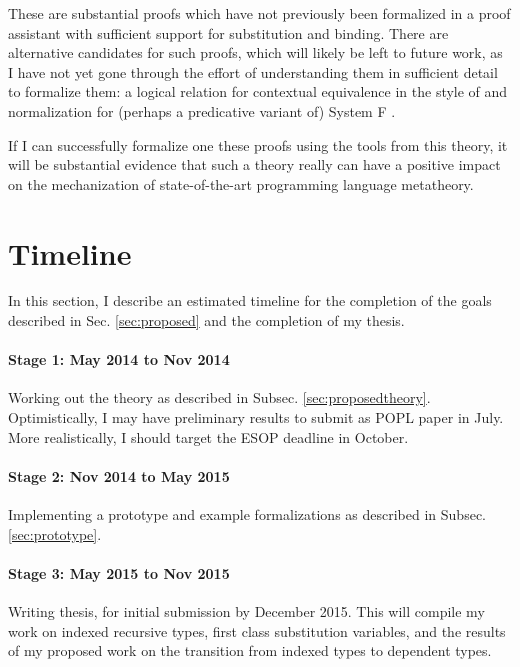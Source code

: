 \documentclass{article}
\begin{document}
These are substantial proofs which have not previously been
formalized in a proof assistant with sufficient support for
substitution and binding. There are alternative candidates for such
proofs, which will likely be left to future work, as I have not yet
gone through the effort of understanding them in sufficient detail to
formalize them: a logical relation
for contextual equivalence in the style of
\cite{Dreyer11} and normalization for (perhaps a predicative variant
of) System F \citep{ProofsAndTypes,Altenkirch93}.

If I can successfully formalize one these proofs using the tools from
this theory, it will be substantial evidence that such a theory really
can have a positive impact on the mechanization of state-of-the-art
programming language metatheory.


\section{Timeline}
In this section, I describe an estimated timeline for the completion
of the goals described in Sec. \ref{sec:proposed} and the
completion of my thesis.

\paragraph{Stage 1:  May 2014 to Nov 2014} Working out the
theory as described in Subsec. \ref{sec:proposedtheory}. Optimistically, I may have preliminary results to submit
as POPL paper in July. More realistically, I should target the ESOP deadline in October.

\paragraph{Stage 2: Nov 2014 to May 2015} Implementing a prototype and
example formalizations as described in Subsec. \ref{sec:prototype}.

\paragraph{Stage 3: May 2015 to Nov 2015} Writing thesis, for initial submission by
December 2015. This will compile my work on indexed recursive types, first class substitution
variables, and the results of my proposed work on the transition from indexed types
to dependent types.
\end{document}
